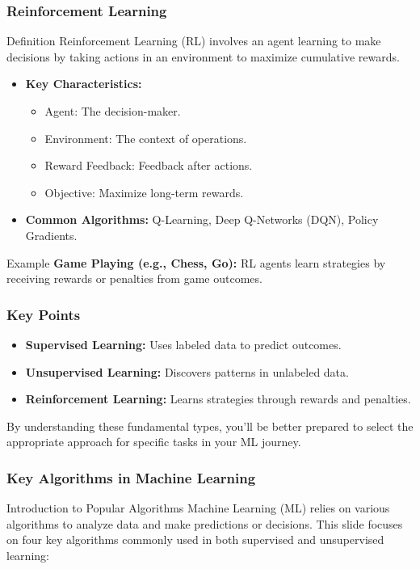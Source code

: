 \documentclass{beamer}
\begin{document}
\begin{frame}[fragile]
    \frametitle{Reinforcement Learning}
    \begin{block}{Definition}
        Reinforcement Learning (RL) involves an agent learning to make decisions by taking actions in an environment to maximize cumulative rewards.
    \end{block}
    \begin{itemize}
        \item \textbf{Key Characteristics:}
        \begin{itemize}
            \item Agent: The decision-maker.
            \item Environment: The context of operations.
            \item Reward Feedback: Feedback after actions.
            \item Objective: Maximize long-term rewards.
        \end{itemize}
        \item \textbf{Common Algorithms:} Q-Learning, Deep Q-Networks (DQN), Policy Gradients.
    \end{itemize}
    \begin{block}{Example}
        \textbf{Game Playing (e.g., Chess, Go):} RL agents learn strategies by receiving rewards or penalties from game outcomes.
    \end{block}
\end{frame}

\begin{frame}[fragile]
    \frametitle{Key Points}
    \begin{itemize}
        \item \textbf{Supervised Learning:} Uses labeled data to predict outcomes.
        \item \textbf{Unsupervised Learning:} Discovers patterns in unlabeled data.
        \item \textbf{Reinforcement Learning:} Learns strategies through rewards and penalties.
    \end{itemize}
    By understanding these fundamental types, you'll be better prepared to select the appropriate approach for specific tasks in your ML journey.
\end{frame}

\begin{frame}[fragile]
    \frametitle{Key Algorithms in Machine Learning}
    \begin{block}{Introduction to Popular Algorithms}
        Machine Learning (ML) relies on various algorithms to analyze data and make predictions or decisions. This slide focuses on four key algorithms commonly used in both supervised and unsupervised learning:
    \end{block}
\end{frame}
\end{document}
